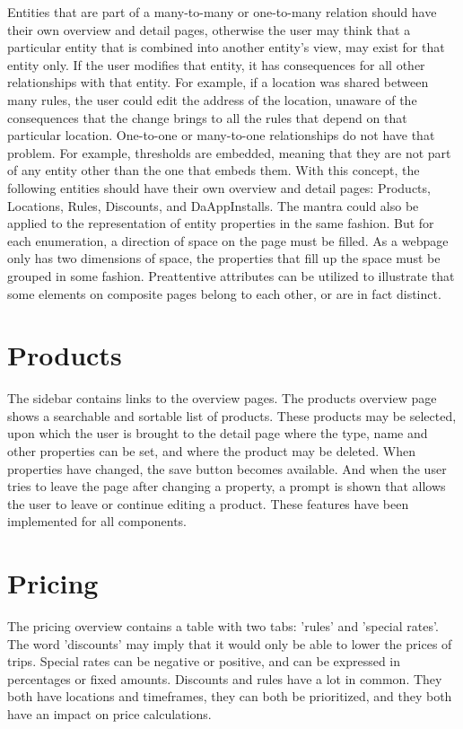 Entities that are part of a many-to-many or one-to-many relation should have their own overview and detail pages, otherwise the user may think that a particular entity that is combined into another entity's view, may exist for that entity only. If the user modifies that entity, it has consequences for all other relationships with that entity. For example, if a location was shared between many rules, the user could edit the address of the location, unaware of the consequences that the change brings to all the rules that depend on that particular location. One-to-one or many-to-one relationships do not have that problem. For example, thresholds are embedded, meaning that they are not part of any entity other than the one that embeds them. With this concept, the following entities should have their own overview and detail pages: Products, Locations, Rules, Discounts, and DaAppInstalls. The mantra could also be applied to the representation of entity properties in the same fashion. But for each enumeration, a direction of space on the page must be filled. As a webpage only has two dimensions of space, the properties that fill up the space must be grouped in some fashion. Preattentive attributes can be utilized to illustrate that some elements on composite pages belong to each other, or are in fact distinct.

\section{Products}
The sidebar contains links to the overview pages. The products overview page shows a searchable and sortable list of products. These products may be selected, upon which the user is brought to the detail page where the type, name and other properties can be set, and where the product may be deleted. When properties have changed, the save button becomes available. And when the user tries to leave the page after changing a property, a prompt is shown that allows the user to leave or continue editing a product. These features have been implemented for all components.

\section{Pricing}
The pricing overview contains a table with two tabs: 'rules' and 'special rates'. The word 'discounts' may imply that it would only be able to lower the prices of trips. Special rates can be negative or positive, and can be expressed in percentages or fixed amounts. Discounts and rules have a lot in common. They both have locations and timeframes, they can both be prioritized, and they both have an impact on price calculations.

